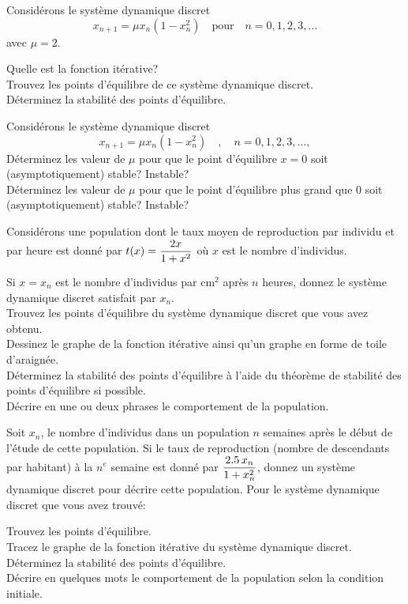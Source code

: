 \begin{question}[\life]
Considérons le système dynamique discret
\[
x_{n+1} = \mu x_n ( 1- x_n^2) \quad \text{pour} \quad n=0, 1, 2, 3,
\ldots
\]
avec $\mu = 2$.

 Quelle est la fonction itérative?\\
 Trouvez les points d'équilibre de ce système dynamique discret.\\
 Déterminez la stabilité des points d'équilibre.
\label{6Q108}
\end{question}

\begin{question}[\life]
Considérons le système dynamique discret
\[
x_{n+1} = \mu x_n ( 1- x_n^2)\quad , \quad n=0, 1, 2, 3, \ldots ,
\]
 Déterminez les valeur de $\mu$ pour que le point d'équilibre
$x=0$ soit (asymptotiquement) stable?  Instable?\\
 Déterminez les valeur de $\mu$ pour que le point d'équilibre
plus grand que $0$ soit (asymptotiquement) stable?  Instable?
\label{6Q109}
\end{question}

\begin{question}[\life]
Considérons une population dont le taux moyen de reproduction par
individu et par heure est donné par
$\displaystyle t(x) = \frac{2 x}{1+x^2}$ où $x$ est le nombre
d'individus.

 Si $x=x_n$ est le nombre d'individus par cm$^2$ après $n$
heures, donnez le système dynamique discret satisfait par $x_n$.\\
 Trouvez les points d'équilibre du système dynamique discret que vous
avez obtenu.\\
 Dessinez le graphe de la fonction itérative ainsi qu'un graphe en
forme de toile d'araignée.\\
 Déterminez la stabilité des points d'équilibre à l'aide du théorème de
stabilité des points d'équilibre si possible.\\
 Décrire en une ou deux phrases le comportement de la population.
\label{6Q110}
\end{question}

\begin{question}[\life]
Soit $x_n$, le nombre d'individus dans un population $n$ semaines
après le début de l'étude de cette population.  Si le taux de
reproduction (nombre de descendants par habitant) à la $n^e$ semaine
est donné par $\displaystyle \frac{2.5\,x_n}{1+x_n^2}$, donnez un
système dynamique discret pour décrire cette population.  Pour le
système dynamique discret que vous avez trouvé:

 Trouvez les points d'équilibre.\\
 Tracez le graphe de la fonction itérative du système dynamique
discret.\\
 Déterminez la stabilité des points d'équilibre.\\
 Décrire en quelques mots le comportement de la population selon la
condition initiale.
\label{6Q111}
\end{question}

